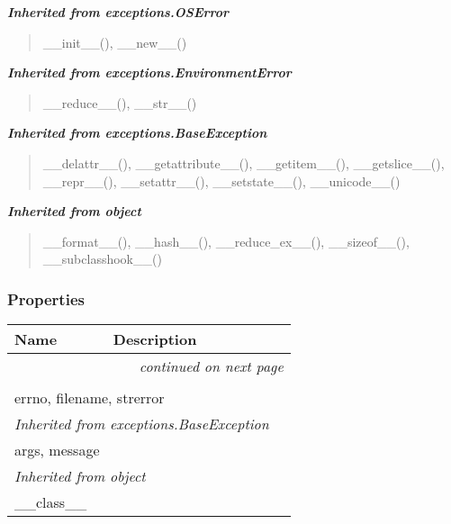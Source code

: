 \large{\textbf{\textit{Inherited from exceptions.OSError}}}

\begin{quote}
\_\_init\_\_(), \_\_new\_\_()
\end{quote}

\large{\textbf{\textit{Inherited from exceptions.EnvironmentError}}}

\begin{quote}
\_\_reduce\_\_(), \_\_str\_\_()
\end{quote}

\large{\textbf{\textit{Inherited from exceptions.BaseException}}}

\begin{quote}
\_\_delattr\_\_(), \_\_getattribute\_\_(), \_\_getitem\_\_(), \_\_getslice\_\_(), \_\_repr\_\_(), \_\_setattr\_\_(), \_\_setstate\_\_(), \_\_unicode\_\_()
\end{quote}

\large{\textbf{\textit{Inherited from object}}}

\begin{quote}
\_\_format\_\_(), \_\_hash\_\_(), \_\_reduce\_ex\_\_(), \_\_sizeof\_\_(), \_\_subclasshook\_\_()
\end{quote}


  \subsubsection{Properties}

    \vspace{-1cm}
\hspace{\varindent}\begin{longtable}{|p{\varnamewidth}|p{\vardescrwidth}|l}
\cline{1-2}
\cline{1-2} \centering \textbf{Name} & \centering \textbf{Description}& \\
\cline{1-2}
\endhead\cline{1-2}\multicolumn{3}{r}{\small\textit{continued on next page}}\\\endfoot\cline{1-2}
\endlastfoot\multicolumn{2}{|l|}{\textit{Inherited from exceptions.EnvironmentError}}\\
\multicolumn{2}{|p{\varwidth}|}{\raggedright errno, filename, strerror}\\
\cline{1-2}
\multicolumn{2}{|l|}{\textit{Inherited from exceptions.BaseException}}\\
\multicolumn{2}{|p{\varwidth}|}{\raggedright args, message}\\
\cline{1-2}
\multicolumn{2}{|l|}{\textit{Inherited from object}}\\
\multicolumn{2}{|p{\varwidth}|}{\raggedright \_\_class\_\_}\\
\cline{1-2}
\end{longtable}

